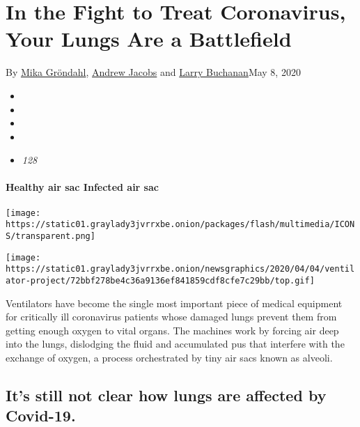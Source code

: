 \hypertarget{in-the-fight-to-treat-coronavirus-your-lungs-are-a-battlefield}{%
\section{In the Fight to Treat Coronavirus, Your Lungs Are a
Battlefield}\label{in-the-fight-to-treat-coronavirus-your-lungs-are-a-battlefield}}

By \href{https://www.nytimes3xbfgragh.onion/by/mika-grondahl}{Mika
Gröndahl},
\href{https://www.nytimes3xbfgragh.onion/by/andrew-jacobs}{Andrew
Jacobs} and
\href{https://www.nytimes3xbfgragh.onion/by/larry-buchanan}{Larry
Buchanan}May 8, 2020

\begin{itemize}
\item
\item
\item
\item
\item
  \emph{128}
\end{itemize}

\hypertarget{healthy-air-sac-infected-air-sac}{%
\paragraph{Healthy air sac Infected air
sac}\label{healthy-air-sac-infected-air-sac}}

\texttt{[image: https://static01.graylady3jvrrxbe.onion/packages/flash/multimedia/ICONS/transparent.png]}

\texttt{[image: https://static01.graylady3jvrrxbe.onion/newsgraphics/2020/04/04/ventilator-project/72bbf278be4c36a9136ef841859cdf8cfe7c29bb/top.gif]}

Ventilators have become the single most important piece of medical
equipment for critically ill coronavirus patients whose damaged lungs
prevent them from getting enough oxygen to vital organs. The machines
work by forcing air deep into the lungs, dislodging the fluid and
accumulated pus that interfere with the exchange of oxygen, a process
orchestrated by tiny air sacs known as alveoli.

\hypertarget{its-still-not-clear-how-lungs-are-affected-by-covid-19}{%
\subsection{It's still not clear how lungs are affected by
Covid-19.}\label{its-still-not-clear-how-lungs-are-affected-by-covid-19}}

